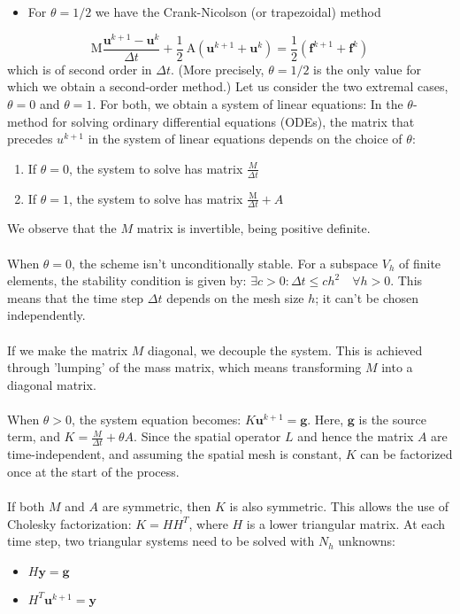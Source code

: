 \documentclass[11pt]{book}
\begin{document}
\begin{itemize}
  \item For $\theta=1 / 2$ we have the Crank-Nicolson (or trapezoidal) method
\end{itemize}
\begin{equation}
\mathrm{M} \frac{\mathbf{u}^{k+1}-\mathbf{u}^{k}}{\Delta t}+\frac{1}{2} \mathrm{~A}\left(\mathbf{u}^{k+1}+\mathbf{u}^{k}\right)=\frac{1}{2}\left(\mathbf{f}^{k+1}+\mathbf{f}^{k}\right)
\end{equation}
which is of second order in $\Delta t$. (More precisely, $\theta=1 / 2$ is the only value for which we obtain a second-order method.)
Let us consider the two extremal cases, $\theta=0$ and $\theta=1$. For both, we obtain a system of linear equations:
In the $\theta$-method for solving ordinary differential equations (ODEs), the matrix that precedes $u^{k+1}$ in the system of linear equations depends on the choice of $\theta$:
\begin{enumerate}
  \item If $\theta=0$, the system to solve has matrix $\frac{M}{\Delta t}$
  \item If $\theta=1$, the system to solve has matrix $\frac{\mathrm{M}}{\Delta t}+A$
\end{enumerate}

We observe that the $M$ matrix is invertible, being positive definite. \\ \\
When \(\theta = 0\), the scheme isn't unconditionally stable. For a subspace \(V_{h}\) of finite elements, the stability condition is given by: \(\exists c > 0: \Delta t \leq c h^{2} \quad \forall h > 0\). This means that the time step \(\Delta t\) depends on the mesh size \(h\); it can't be chosen independently.\\ \\
 If we make the matrix \(M\) diagonal, we decouple the system. This is achieved through 'lumping' of the mass matrix, which means transforming \(M\) into a diagonal matrix.\\ \\
When \(\theta > 0\), the system equation becomes: \(K \mathbf{u}^{k+1} = \mathbf{g}\). Here, \(\mathbf{g}\) is the source term, and \(K = \frac{M}{\Delta t} + \theta A\). Since the spatial operator \(L\) and hence the matrix \(A\) are time-independent, and assuming the spatial mesh is constant, \(K\) can be factorized once at the start of the process.\\ \\
If both \(M\) and \(A\) are symmetric, then \(K\) is also symmetric. This allows the use of Cholesky factorization: \(K = H H^T\), where \(H\) is a lower triangular matrix. At each time step, two triangular systems need to be solved with \(N_{h}\) unknowns:\\
\begin{itemize}
\item \(H \mathbf{y} = \mathbf{g}\)
\item \(H^T \mathbf{u}^{k+1} = \mathbf{y}\)
\end{itemize}
\end{document}
